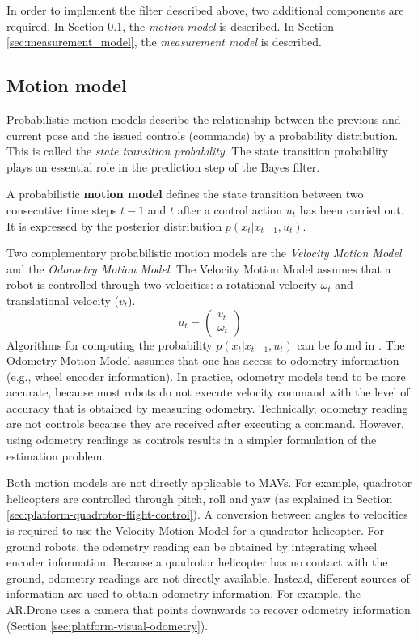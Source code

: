 In order to implement the filter described above, two additional components are required.
In Section \ref{sec:motion_model}, the \textit{motion model} is described.
In Section \ref{sec:measurement_model}, the \textit{measurement model} is described.

		\subsection{Motion model}
		\label{sec:motion_model}
Probabilistic motion models describe the relationship between the previous and current pose and the issued controls (commands) by a probability distribution. This is called the \textit{state transition probability}.
The state transition probability plays an essential role in the prediction step of the Bayes filter.
\begin{mydef}
A probabilistic \textbf{motion model} defines the state transition between two consecutive time steps $t-1$ and $t$ after a control action $u_{t}$ has been carried out. It is expressed by the posterior distribution $p (x_t | x_{t-1}, u_{t})$.
\end{mydef}

Two complementary probabilistic motion models are the \textit{Velocity Motion Model} and the \textit{Odometry Motion Model}.
The Velocity Motion Model assumes that a robot is controlled through two velocities: a rotational velocity $\omega_t$ and translational velocity ($v_t$).
\begin{equation}
u_t = 
\left( \begin{array}{c}
v_t \\
\omega_t \end{array} \right)
\end{equation}
Algorithms for computing the probability $p (x_t | x_{t-1}, u_{t})$ can be found in \cite{fox2005probabilistic}.
The Odometry Motion Model assumes that one has access to odometry information (e.g., wheel encoder information).
In practice, odometry models tend to be more accurate, because most robots do not execute velocity command with the level of accuracy that is obtained by measuring odometry.
Technically, odometry reading are not controls because they are received after executing a command.
However, using odometry readings as controls results in a simpler formulation of the estimation problem.

Both motion models are not directly applicable to MAVs.
For example, quadrotor helicopters are controlled through pitch, roll and yaw (as explained in Section \ref{sec:platform-quadrotor-flight-control}).
A conversion between angles to velocities is required to use the Velocity Motion Model for a quadrotor helicopter.
For ground robots, the odemetry reading can be obtained by integrating wheel encoder information.
Because a quadrotor helicopter has no contact with the ground, odometry readings are not directly available.
Instead, different sources of information are used to obtain odometry information.
For example, the AR.Drone uses a camera that points downwards to recover odometry information (Section \ref{sec:platform-visual-odometry}).


